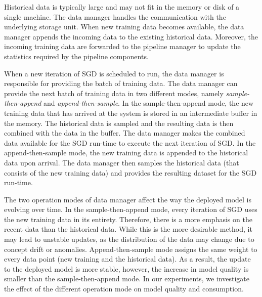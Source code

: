 Historical data is typically large and may not fit in the memory or disk of a single machine. 
The data manager handles the communication with the underlying storage unit.
When new training data becomes available, the data manager appends the incoming data to the existing historical data.
Moreover, the incoming training data are forwarded to the pipeline manager to update the statistics required by the pipeline components.

When a new iteration of SGD is scheduled to run, the data manager is responsible for providing the batch of training data.
The data manager can provide the next batch of training data in two different modes, namely \textit{sample-then-append} and \textit{append-then-sample}.
In the sample-then-append mode, the new training data that has arrived at the system is stored in an intermediate buffer in the memory.
The historical data is sampled and the resulting data is then combined with the data in the buffer.
The data manager makes the combined data available for the SGD run-time to execute the next iteration of SGD.
In the append-then-sample mode, the new training data is appended to the historical data upon arrival.
The data manager then samples the historical data (that consists of the new training data) and provides the resulting dataset for the SGD run-time.

The two operation modes of data manager affect the way the deployed model is evolving over time.
In the sample-then-append mode, every iteration of SGD uses the new training data in its entirety.
Therefore, there is a more emphasis on the recent data than the historical data.
While this is the more desirable method, it may lead to unstable updates, as the distribution of the data may change due to concept drift or anomalies.
Append-then-sample mode assigns the same weight to every data point (new training and the historical data).
As a result, the update to the deployed model is more stable, however, the increase in model quality is smaller than the sample-then-append mode.
In our experiments, we investigate the effect of the different operation mode on model quality and consumption.


